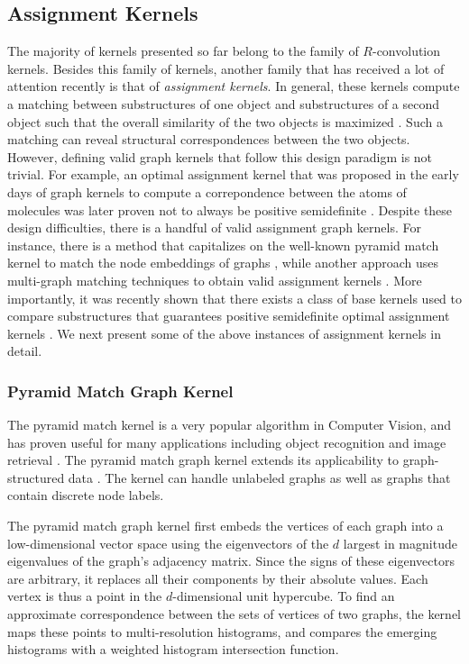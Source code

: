 \documentclass[twoside,11pt]{article}
\begin{document}
\subsection{Assignment Kernels}
The majority of kernels presented so far belong to the family of $R$-convolution kernels.
Besides this family of kernels, another family that has received a lot of attention recently is that of \textit{assignment kernels}.
In general, these kernels compute a matching between substructures of one object and substructures of a second object such that the overall similarity of the two objects is maximized .
Such a matching can reveal structural correspondences between the two objects.
However, defining valid graph kernels that follow this design paradigm is not trivial.
For example, an optimal assignment kernel that was proposed in the early days of graph kernels to compute a correpondence between the atoms of molecules  was later proven not to always be positive semidefinite .
Despite these design difficulties, there is a handful of valid assignment graph kernels.
For instance, there is a method that capitalizes on the well-known pyramid match kernel to match the node embeddings of graphs , while another approach uses multi-graph matching techniques to obtain valid assignment kernels .
More importantly, it was recently shown that there exists a class of base kernels used to compare substructures that guarantees positive semidefinite optimal assignment kernels .
We next present some of the above instances of assignment kernels in detail.


\subsubsection{Pyramid Match Graph Kernel}
The pyramid match kernel is a very popular algorithm in Computer Vision, and has proven useful for many applications including object recognition and image retrieval .
The pyramid match graph kernel extends its applicability to graph-structured data .
The kernel can handle unlabeled graphs as well as graphs that contain discrete node labels.

The pyramid match graph kernel first embeds the vertices of each graph into a low-dimensional vector space using the eigenvectors of the $d$ largest in magnitude eigenvalues of the graph's adjacency matrix.
Since the signs of these eigenvectors are arbitrary, it replaces all their components by their absolute values.
Each vertex is thus a point in the $d$-dimensional unit hypercube.
To find an approximate correspondence between the sets of vertices of two graphs, the kernel maps these points to multi-resolution histograms, and compares the emerging histograms with a weighted histogram intersection function.
\end{document}
